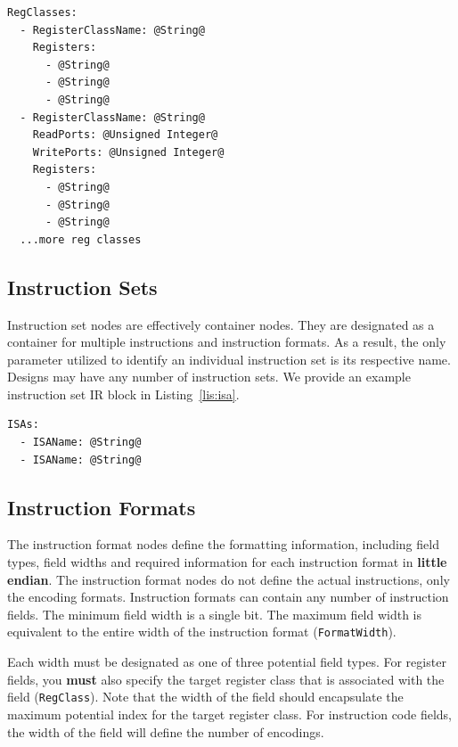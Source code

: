 \documentclass{article}
\begin{document}
\vspace{0.125in}
\begin{lstlisting}[frame=single,style=base,caption={Register Class Node Definition},captionpos=b,label={lis:regclassnode}]
RegClasses:
  - RegisterClassName: @String@
    Registers:
      - @String@
      - @String@
      - @String@
  - RegisterClassName: @String@
    ReadPorts: @Unsigned Integer@
    WritePorts: @Unsigned Integer@
    Registers:
      - @String@
      - @String@
      - @String@
  ...more reg classes
\end{lstlisting} 

\clearpage
\subsection{Instruction Sets}
\label{sec:InstructionSetNodes}

Instruction set nodes are effectively container nodes.  They are designated as a container for multiple 
instructions and instruction formats.  As a result, the only parameter utilized to identify an individual 
instruction set is its respective name.  Designs may have any number of instruction sets.  We provide an 
example instruction set IR block in Listing~\ref{lis:isa}.  

\vspace{0.125in}
\begin{lstlisting}[frame=single,style=base,caption={Instruction Set Node Definition},captionpos=b,label={lis:isa}]
ISAs:
  - ISAName: @String@
  - ISAName: @String@
\end{lstlisting}

\clearpage
\subsection{Instruction Formats}
\label{sec:InstructionFormatNodes}

The instruction format nodes define the formatting information, including field types, field widths and required 
information for each instruction format in \textbf{little endian}.  The instruction format nodes do not define the actual instructions, only 
the encoding formats.  Instruction formats can contain any number of instruction fields.  The minimum field 
width is a single bit.  The maximum field width is equivalent to the entire width of the instruction format (\texttt{FormatWidth}).  

Each width must be designated as one of three potential field types.  For register fields, you \textbf{must} also 
specify the target register class that is associated with the field (\texttt{RegClass}).  Note that the width of the 
field should encapsulate the maximum potential index for the target register class.  For instruction code fields, 
the width of the field will define the number of encodings.
\end{document}
